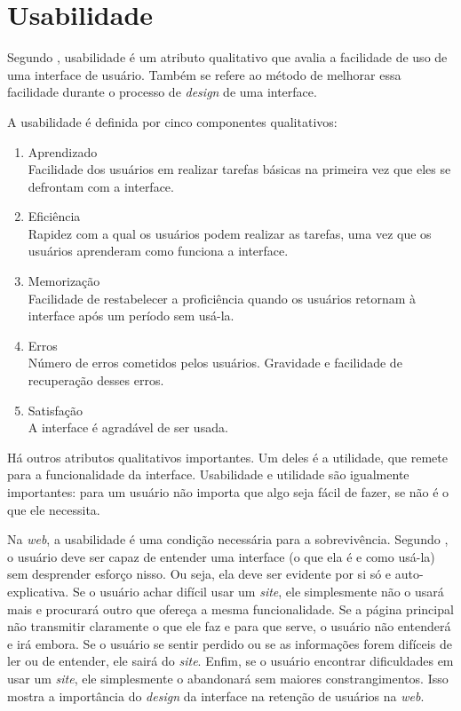 \section{Usabilidade}

Segundo , usabilidade é um atributo qualitativo que avalia a facilidade de uso de uma interface de usuário. Também se refere ao método de melhorar essa facilidade durante o processo de \textit{design} de uma interface.

A usabilidade é definida por cinco componentes qualitativos:
    \begin{enumerate}
        \item Aprendizado \\
            Facilidade dos usuários em realizar tarefas básicas na primeira vez que eles se defrontam com a interface.
        \item Eficiência \\
            Rapidez com a qual os usuários podem realizar as tarefas, uma vez que os usuários aprenderam como funciona a interface.
        \item Memorização \\
            Facilidade de restabelecer a proficiência quando os usuários retornam à interface após um período sem usá-la.
        \item Erros \\
            Número de erros cometidos pelos usuários. Gravidade e facilidade de recuperação desses erros.
        \item Satisfação \\
            A interface é agradável de ser usada.
    \end{enumerate}

Há outros atributos qualitativos importantes. Um deles é a utilidade, que remete para a funcionalidade da interface. Usabilidade e utilidade são igualmente importantes: para um usuário não importa que algo seja fácil de fazer, se não é o que ele necessita. 

Na \textit{web}, a usabilidade é uma condição necessária para a sobrevivência. Segundo , o usuário deve ser capaz de entender uma interface (o que ela é e como usá-la) sem desprender esforço nisso. Ou seja, ela deve ser evidente por si só e auto-explicativa. Se o usuário achar difícil usar um \textit{site}, ele simplesmente não o usará mais e procurará outro que ofereça a mesma funcionalidade. Se a página principal não transmitir claramente o que ele faz e para que serve, o usuário não entenderá e irá embora. Se o usuário se sentir perdido ou se as informações forem difíceis de ler ou de entender, ele sairá do \textit{site}. Enfim, se o usuário encontrar dificuldades em usar um \textit{site}, ele simplesmente o abandonará sem maiores constrangimentos. Isso mostra a importância do \textit{design} da interface na retenção de usuários na \textit{web}.

